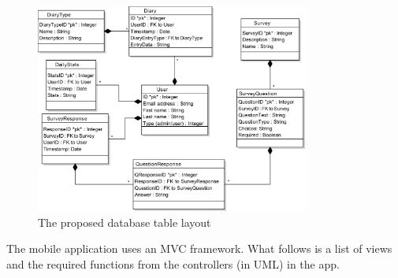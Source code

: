 \documentclass[a4paper, 11pt, titlepage]{article}
\begin{document}
\begin{figure}[H]
	\centering
	\includegraphics[width=0.8\textwidth]{figures/object-models/db-schema.pdf}
	\caption{The proposed database table layout}
\end{figure}

The mobile application uses an MVC framework. What follows is a list of views and the required functions from the controllers (in UML) in the app.
\end{document}
